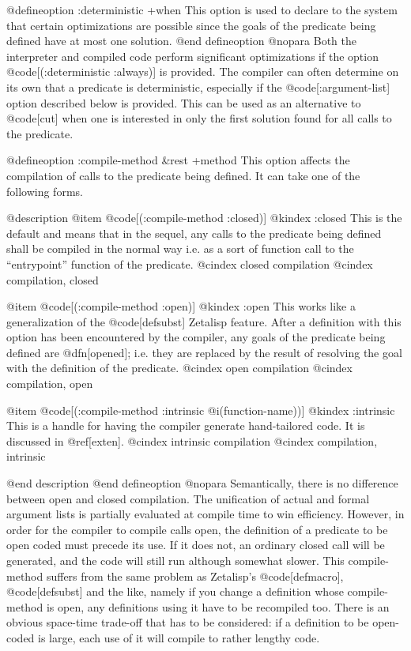 {@defineoption :deterministic +when
This option is used to declare to the system that certain optimizations are
possible since the goals of the predicate being defined have at most one
solution.
@end defineoption
@nopara
Both the interpreter and compiled code perform significant optimizations if 
the option @code[(:deterministic :always)] is provided.
The compiler can often determine on its own that a predicate is deterministic,
especially if the @code[:argument-list] option described below is provided.
This can be used as an alternative to @code[cut] when one is interested in only
the first solution found for all calls to the predicate.

@defineoption :compile-method &rest +method
This option affects the compilation of calls to the predicate being defined. 
It can take one of the following forms.

@description
@item @code[(:compile-method :closed)]
@kindex :closed
This is the default and means that in the sequel, any calls to
the predicate being defined shall be compiled in the normal way i.e. as a
sort of function call to the ``entrypoint'' function of the predicate.
@cindex closed compilation
@cindex compilation, closed

@item @code[(:compile-method :open)]
@kindex :open
This works like a generalization of the @code[defsubst] Zetalisp feature.
After a definition with this option has been encountered by the compiler, 
any goals of the predicate being defined are @dfn[opened]; 
i.e. they are replaced by the 
result of resolving the goal with the definition of the predicate.
@cindex open compilation
@cindex compilation, open

@item @code[(:compile-method :intrinsic @i(function-name))]
@kindex :intrinsic
This is a handle for having the compiler generate hand-tailored code.
It is discussed in @ref[exten].
@cindex intrinsic compilation
@cindex compilation, intrinsic

@end description
@end defineoption
@nopara
Semantically, there is no difference between open and closed
compilation.  The unification of actual and formal argument lists is
partially evaluated at compile time to win efficiency.  However, in
order for the compiler to compile calls open, the definition of a
predicate to be open coded must precede its use.  If it does not, an
ordinary closed call will be generated, and the code will still run
although somewhat slower.  This compile-method suffers from the same
problem as Zetalisp's @code[defmacro], @code[defsubst] and the like,
namely if you change a definition whose compile-method is open, any
definitions using it have to be recompiled too.  There is an obvious
space-time trade-off that has to be considered: if a definition to be
open-coded is large, each use of it will compile to rather lengthy
code.

}
